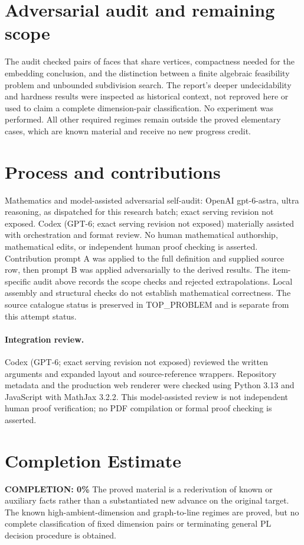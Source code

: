 \documentclass[11pt]{article}
\begin{document}
\section{Adversarial audit and remaining scope}
The audit checked pairs of faces that share vertices, compactness needed for
the embedding conclusion, and the distinction between a finite algebraic
feasibility problem and unbounded subdivision search. The report's deeper
undecidability and hardness results were inspected as historical context,
not reproved here or used to claim a complete dimension-pair classification.
No experiment was performed. All other required regimes remain outside the
proved elementary cases, which are known material and receive no new progress credit.

\section{Process and contributions}
Mathematics and model-assisted adversarial self-audit: OpenAI gpt-6-astra, ultra reasoning, as dispatched for this research batch; exact serving revision not exposed. Codex (GPT-6; exact serving revision not exposed) materially assisted with orchestration and format review. No human mathematical authorship, mathematical edits, or independent human proof checking is asserted.
Contribution prompt A was applied to the full definition and supplied source row, then prompt B was applied adversarially to the derived results. The item-specific audit above records the scope checks and rejected extrapolations. Local assembly and structural checks do not establish mathematical correctness. The source catalogue status is preserved in TOP\_PROBLEM and is separate from this attempt status.
\paragraph{Integration review.} Codex (GPT-6; exact serving revision not exposed) reviewed the written arguments and expanded layout and source-reference wrappers. Repository metadata and the production web renderer were checked using Python 3.13 and JavaScript with MathJax 3.2.2. This model-assisted review is not independent human proof verification; no PDF compilation or formal proof checking is asserted.

\section{Completion Estimate}
\noindent\textbf{COMPLETION: 0\%}
The proved material is a rederivation of known or auxiliary facts rather than a substantiated new advance on the original target. The known high-ambient-dimension and graph-to-line regimes are proved, but no complete classification of fixed dimension pairs or terminating general PL decision procedure is obtained.
\end{document}
